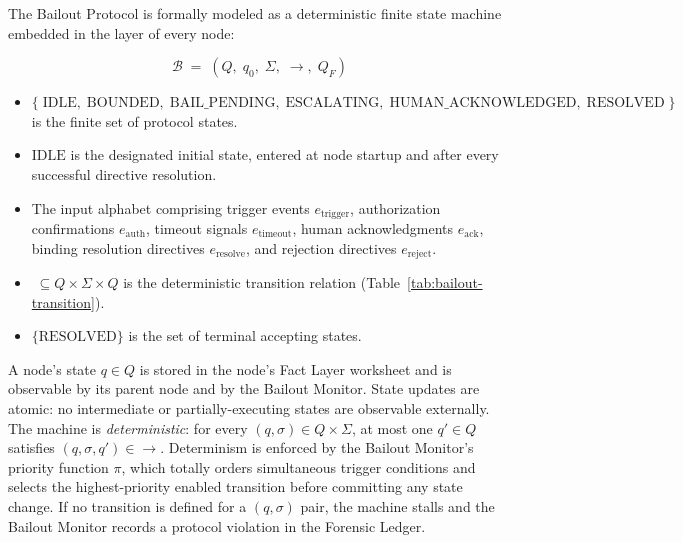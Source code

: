 The Bailout Protocol is formally modeled as a deterministic finite state machine embedded in the \fact{} layer of every \bxthree{} node:

\[
\mathcal{B} \;=\; (Q,\; q_0,\; \Sigma,\; \rightarrow,\; Q_F)
\]

\begin{itemize}\itemsep=0pt
\item[$Q$] $\{\;\text{IDLE},\; \text{BOUNDED},\; \text{BAIL\_PENDING},\; \text{ESCALATING},\; \text{HUMAN\_ACKNOWLEDGED},\; \text{RESOLVED}\;\}$ is the finite set of protocol states.
\item[$q_0$] $\text{IDLE}$ is the designated initial state, entered at node startup and after every successful directive resolution.
\item[$\Sigma$] The input alphabet comprising trigger events $e_{\text{trigger}}$, authorization confirmations $e_{\text{auth}}$, timeout signals $e_{\text{timeout}}$, human acknowledgments $e_{\text{ack}}$, binding resolution directives $e_{\text{resolve}}$, and rejection directives $e_{\text{reject}}$.
\item[$\rightarrow$] $\; \subseteq Q \times \Sigma \times Q$ is the deterministic transition relation (Table~\ref{tab:bailout-transition}).
\item[$Q_F$] $\{\text{RESOLVED}\}$ is the set of terminal accepting states.
\end{itemize}

A node's state $q \in Q$ is stored in the node's Fact Layer worksheet and is observable by its parent node and by the Bailout Monitor. State updates are atomic: no intermediate or partially-executing states are observable externally. The machine is \emph{deterministic}: for every $(q, \sigma) \in Q \times \Sigma$, at most one $q' \in Q$ satisfies $(q, \sigma, q') \in \rightarrow$. Determinism is enforced by the Bailout Monitor's priority function $\pi$, which totally orders simultaneous trigger conditions and selects the highest-priority enabled transition before committing any state change. If no transition is defined for a $(q, \sigma)$ pair, the machine stalls and the Bailout Monitor records a protocol violation in the Forensic Ledger.

